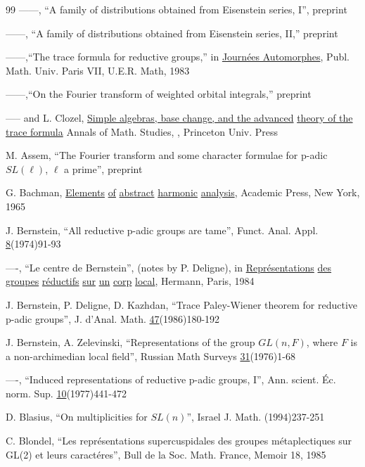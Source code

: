 \begin{thebibliography}{99}
 ------, ``A family of distributions obtained from 
Eisenstein series, I'', preprint

 ------, ``A family of distributions obtained from 
Eisenstein series, II,'' preprint

 ------,``The trace formula for reductive groups,'' in
\underline{Journ\'ees Automorphes}, Publ. Math. Univ. Paris VII,
U.E.R. Math, 1983

 ------,``On the Fourier transform of weighted 
orbital integrals,'' preprint

 ----- and L. Clozel, \underline{Simple algebras,
base change, and the advanced} \underline{theory of the trace formula}
Annals of Math. Studies, , Princeton Univ. Press

 M. Assem,
``The Fourier transform and some character formulae for p-adic 
$SL(\ell )$, $\ell $ a prime'', preprint

 G. Bachman,
\underline{Elements} \underline{of} \underline{abstract} 
\underline{harmonic} \underline{analysis}, Academic Press, New York, 1965

 J. Bernstein, ``All reductive p-adic groups are tame'', 
Funct. Anal.
Appl. \underline{8}(1974)91-93

 ----, ``Le centre de Bernstein'', (notes by P. Deligne), 
in \underline{Repr\'esentations} \underline{des} 
\underline{groupes} \underline{r\'eductifs} 
\underline{sur} \underline{un} \underline{corp} \underline{local},
Hermann, Paris, 1984

 J. Bernstein, P. Deligne, D. Kazhdan, ``Trace 
Paley-Wiener theorem for
reductive p-adic groups'', J. d'Anal. Math. \underline{47}(1986)180-192

 J. Bernstein, A. Zelevinski, ``Representations of 
the group $GL(n,F)$,
where $F$ is a non-archimedian local field'', Russian Math Surveys
\underline{31}(1976)1-68

 ----, ``Induced representations of reductive p-adic 
groups, I'', Ann.
scient. \'Ec. norm. Sup. \underline{10}(1977)441-472

 D. Blasius, ``On multiplicities for $SL(n)$'',
Israel J. Math. (1994)237-251

 C. Blondel, ``Les repr\'esentations supercuspidales 
des groupes
m\'etaplectiques sur GL(2) et leurs caract\'eres'',
Bull de la Soc. Math. France, Memoir 18, 1985


\end{thebibliography}
